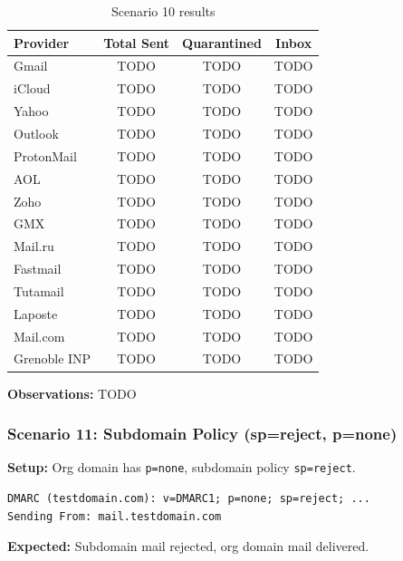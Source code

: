\documentclass[11pt,a4paper]{article}
\begin{document}
\begin{table}[h]
\centering
\small
\begin{tabular}{lccc}
\toprule
\textbf{Provider} & \textbf{Total Sent} & \textbf{Quarantined} & \textbf{Inbox} \\
\midrule
Gmail & TODO & TODO & TODO \\
iCloud & TODO & TODO & TODO \\
Yahoo & TODO & TODO & TODO \\
Outlook & TODO & TODO & TODO \\
ProtonMail & TODO & TODO & TODO \\
AOL & TODO & TODO & TODO \\
Zoho & TODO & TODO & TODO \\
GMX & TODO & TODO & TODO \\
Mail.ru & TODO & TODO & TODO \\
Fastmail & TODO & TODO & TODO \\
Tutamail & TODO & TODO & TODO \\
Laposte & TODO & TODO & TODO \\
Mail.com & TODO & TODO & TODO \\
Grenoble INP & TODO & TODO & TODO \\
\bottomrule
\end{tabular}
\caption{Scenario 10 results}
\end{table}

\textbf{Observations:} TODO


\subsubsection{Scenario 11: Subdomain Policy (sp=reject, p=none)}

\textbf{Setup:} Org domain has \texttt{p=none}, subdomain policy \texttt{sp=reject}.

\begin{lstlisting}
DMARC (testdomain.com): v=DMARC1; p=none; sp=reject; ...
Sending From: mail.testdomain.com
\end{lstlisting}

\textbf{Expected:} Subdomain mail rejected, org domain mail delivered.
\end{document}
